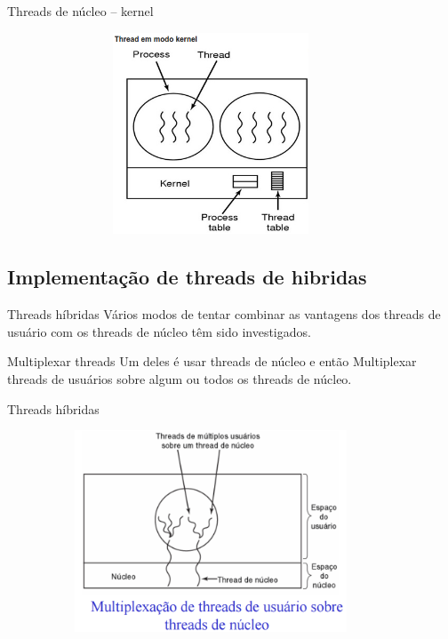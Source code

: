 \documentclass[11pt]{beamer}
\begin{document}
\begin{frame}{ Threads de núcleo -- kernel}
\begin{figure}[h]

\includegraphics[width=100mm, height=60mm]{Figuras/threadnucleo}
\end{figure}

\end{frame}

\subsection*{Implementação de threads de hibridas}

\begin{frame}{ Threads híbridas}
 Vários modos de tentar combinar as vantagens dos threads de usuário com os threads de núcleo têm sido investigados.
 
 \pause
 \begin{block}{Multiplexar threads}
 Um deles é usar threads de núcleo e então Multiplexar threads de usuários sobre algum ou todos os threads de núcleo.
 \end{block}
 
\end{frame}

\begin{frame}{ Threads híbridas}
\begin{figure}[h]

\includegraphics[width=100mm, height=60mm]{Figuras/threadhibrida}
\end{figure}

\end{frame}
\end{document}
